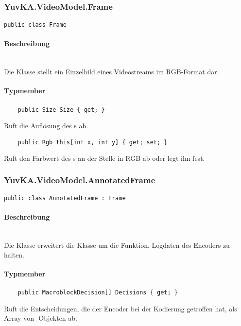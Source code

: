 \subsubsection{YuvKA.VideoModel.Frame}

\begin{verbatim}
public class Frame
\end{verbatim}

\paragraph{Beschreibung}~\\
Die Klasse  stellt ein Einzelbild eines Videostreams im RGB-Format dar.

\paragraph{Typmember}
\begin{itemize}

	\begin{verbatim}
	public Size Size { get; }
	\end{verbatim}
	Ruft die Auflösung des s ab.

	\begin{verbatim}
	public Rgb this[int x, int y] { get; set; }
	\end{verbatim}
	Ruft den Farbwert des s an der Stelle  in RGB ab oder legt ihn fest.

\end{itemize}

\subsubsection{YuvKA.VideoModel.AnnotatedFrame}

\begin{verbatim}
public class AnnotatedFrame : Frame
\end{verbatim}

\paragraph{Beschreibung}~\\
Die Klasse  erweitert die Klasse  um die Funktion, Logdaten des Encoders zu halten.

\paragraph{Typmember}
\begin{itemize}

	\begin{verbatim}
	public MacroblockDecision[] Decisions { get; }
	\end{verbatim}
	Ruft die Entscheidungen, die der Encoder bei der Kodierung getroffen hat, als Array von -Objekten ab.

\end{itemize}

